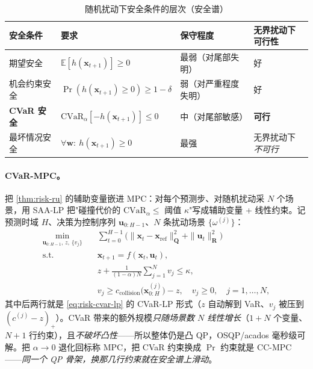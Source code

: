 \begin{table}[H]\centering\small
\caption{随机扰动下安全条件的层次（安全谱）}
\label{tab:risk-safety}
\begin{tabular}{llll}
\toprule
安全条件 & 要求 & 保守程度 & 无界扰动下可行性 \\
\midrule
期望安全 & $\mathbb{E}[h(\mathbf{x}_{t+1})]\ge0$ & 最弱（对尾部失明）& 好 \\
机会约束安全 & $\Pr(h(\mathbf{x}_{t+1})\ge0)\ge1-\delta$ & 弱（对严重程度失明）& 好 \\
\textbf{CVaR 安全} & $\mathrm{CVaR}_\alpha[-h(\mathbf{x}_{t+1})]\le0$ & 中（对尾部敏感）& \textbf{可行} \\
最坏情况安全 & $\forall \mathbf{w}:\ h(\mathbf{x}_{t+1})\ge0$ & 最强 & 无界扰动下\emph{不可行} \\
\bottomrule
\end{tabular}
\end{table}

\paragraph{CVaR-MPC。}
把 \cref{thm:risk-ru} 的辅助变量嵌进 MPC：对每个预测步、对随机扰动采 $N$ 个场景，用 SAA-LP 把"碰撞代价的 $\mathrm{CVaR}_\alpha\le$ 阈值 $\kappa$"写成辅助变量 + 线性约束。记预测时域 $H$、决策为控制序列 $\mathbf{u}_{0:H-1}$、$N$ 条扰动场景 $\{\omega^{(j)}\}$：
\begin{equation}
\begin{aligned}
\min_{\mathbf{u}_{0:H-1},\,z,\,\{v_j\}}\quad & \sum_{t=0}^{H-1}\big(\|\mathbf{x}_t-\mathbf{x}_{\mathrm{ref}}\|_{\mathbf{Q}}^2+\|\mathbf{u}_t\|_{\mathbf{R}}^2\big)\\
\text{s.t.}\quad & \mathbf{x}_{t+1}=f(\mathbf{x}_t,\mathbf{u}_t),\\
& z+\frac{1}{(1-\alpha)N}\sum_{j=1}^N v_j\le\kappa,\\
& v_j\ge c_{\mathrm{collision}}\big(\mathbf{x}_{0:H}^{(j)}\big)-z,\quad v_j\ge0,\quad j=1,\dots,N,
\end{aligned}
\label{eq:risk-cvar-mpc}
\end{equation}
其中后两行就是 \cref{eq:risk-cvar-lp} 的 CVaR-LP 形式（$z$ 自动解到 VaR、$v_j$ 被压到 $(c^{(j)}-z)_+$）。CVaR 带来的额外规模\emph{只随场景数 $N$ 线性增长}（$1+N$ 个变量、$N+1$ 行约束），且\emph{不破坏凸性}——所以整体仍是凸 QP，OSQP/acados 毫秒级可解。把 $\alpha\to0$ 退化回标称 MPC，把 CVaR 约束换成 $\Pr$ 约束就是 CC-MPC——\emph{同一个 QP 骨架，换那几行约束就在安全谱上滑动}。

